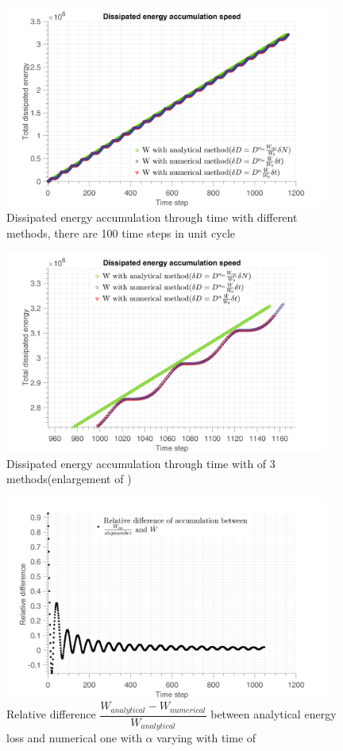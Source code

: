 \begin{figure}[!h]
\centering
\includegraphics[width=0.95\textwidth]{figures//W_3methods2_100steps.png} 
\caption{Dissipated energy accumulation through time with different methods, there are 100 time steps in unit cycle}
\label{fig.W3methods100}
\end{figure}
\begin{figure}[!h]
\centering
\includegraphics[width=0.95\textwidth]{figures//W_3methods_100steps_enlarge.png} 
\caption{Dissipated energy accumulation through time with of 3 methods(enlargement of )}
\label{fig.W3methods2enlarge}
\end{figure}
\begin{figure}[!h]
\centering
\includegraphics[width=0.95\textwidth]{figures//W_3methods_diff_100steps.png} 
\caption{Relative difference $\dfrac{W_{analytical}-W_{numerical}}{W_{analytical}}$ between analytical energy loss and numerical one with $\alpha$ varying with time of }
\label{fig.W3methodsdiff}
\end{figure}
